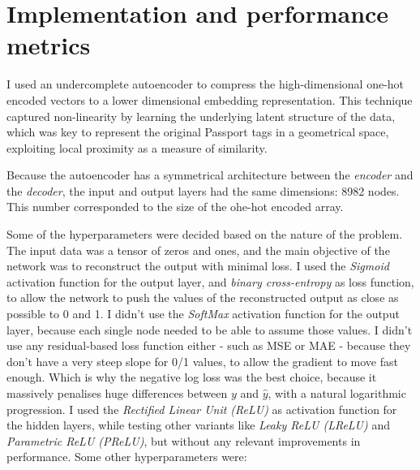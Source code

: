 
\section{Implementation and performance metrics}

I used an undercomplete autoencoder to compress the high-dimensional one-hot encoded vectors to a lower dimensional embedding representation.
This technique captured non-linearity by learning the underlying latent structure of the data, which was key to represent the original
Passport tags in a geometrical space, exploiting local proximity as a measure of similarity.

Because the autoencoder has a symmetrical architecture between the \textit{encoder} and the \textit{decoder}, the input and output layers
had the same dimensions: 8982 nodes. This number corresponded to the size of the ohe-hot encoded array.

Some of the hyperparameters were decided based on the nature of the problem. The input data was a tensor of zeros and ones,
and the main objective of the network was to reconstruct the output with minimal loss.
I used the \textit{Sigmoid} activation function for the output layer, and \textit{binary cross-entropy} as loss function,
to allow the network to push the values of the reconstructed output as close as possible to 0 and 1.
I didn't use the \textit{SoftMax} activation function for the output layer, because each single node needed to be able
to assume those values.
I didn't use any residual-based loss function either - such as MSE or MAE - because they don't have a very steep slope
for 0/1 values, to allow the gradient to move fast enough.
Which is why the negative log loss was the best choice, because it massively penalises huge differences between $y$ and  $\hat{y}$,
with a natural logarithmic progression.
I used the \textit{Rectified Linear Unit (ReLU)} as activation function
for the hidden layers, while testing other variants like \textit{Leaky ReLU (LReLU)} and \textit{Parametric ReLU (PReLU)},
but without any relevant improvements in performance. Some other hyperparameters were:

